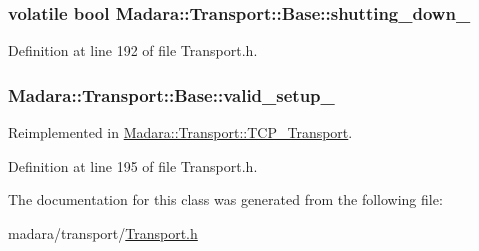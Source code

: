 \hypertarget{classMadara_1_1Transport_1_1Base_a6c3d03895e92c93265704052ab707f8a}{
\subsubsection[{shutting\_\-down\_\-}]{\setlength{\rightskip}{0pt plus 5cm}volatile bool {\bf Madara::Transport::Base::shutting\_\-down\_\-}}}
\label{dc/d97/classMadara_1_1Transport_1_1Base_a6c3d03895e92c93265704052ab707f8a}


Definition at line 192 of file Transport.h.

\hypertarget{classMadara_1_1Transport_1_1Base_a82c2a7ef9058b2c9a520d900c9a9f6e0}{
\subsubsection[{valid\_\-setup\_\-}]{ {\bf Madara::Transport::Base::valid\_\-setup\_\-}}}
\label{dc/d97/classMadara_1_1Transport_1_1Base_a82c2a7ef9058b2c9a520d900c9a9f6e0}


Reimplemented in \hyperlink{classMadara_1_1Transport_1_1TCP__Transport_a2d4ff7935612176cf98a4feaa9d15510}{Madara::Transport::TCP\_\-Transport}.



Definition at line 195 of file Transport.h.



The documentation for this class was generated from the following file:\begin{DoxyCompactItemize}
\item 
madara/transport/\hyperlink{Transport_8h}{Transport.h}\end{DoxyCompactItemize}
